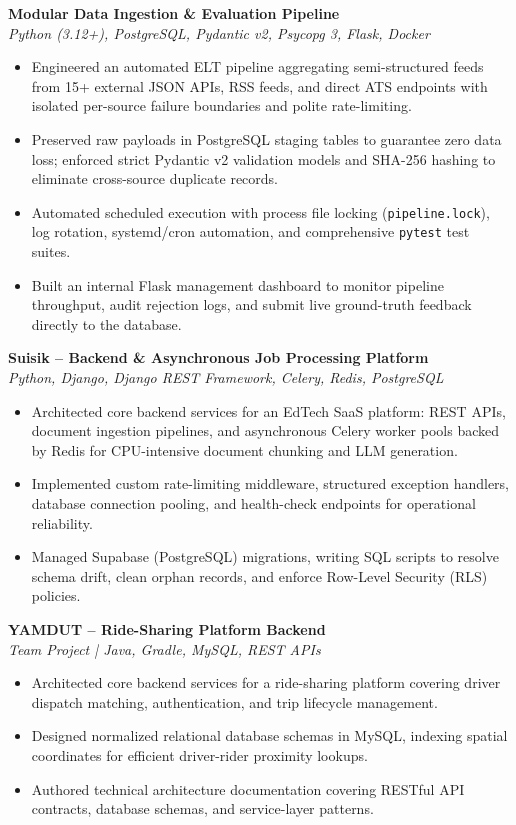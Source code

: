 \documentclass[a4paper,10pt]{article}
\begin{document}
\textbf{Modular Data Ingestion \& Evaluation Pipeline} \\
\textit{Python (3.12+), PostgreSQL, Pydantic v2, Psycopg 3, Flask, Docker}
\begin{itemize}
    \item Engineered an automated ELT pipeline aggregating semi-structured feeds from 15+ external JSON APIs, RSS feeds, and direct ATS endpoints with isolated per-source failure boundaries and polite rate-limiting.
    \item Preserved raw payloads in PostgreSQL staging tables to guarantee zero data loss; enforced strict Pydantic v2 validation models and SHA-256 hashing to eliminate cross-source duplicate records.
    \item Automated scheduled execution with process file locking (\texttt{pipeline.lock}), log rotation, systemd/cron automation, and comprehensive \texttt{pytest} test suites.
    \item Built an internal Flask management dashboard to monitor pipeline throughput, audit rejection logs, and submit live ground-truth feedback directly to the database.
\end{itemize}

\vspace{3pt}
\textbf{Suisik -- Backend \& Asynchronous Job Processing Platform} \\
\textit{Python, Django, Django REST Framework, Celery, Redis, PostgreSQL}
\begin{itemize}
    \item Architected core backend services for an EdTech SaaS platform: REST APIs, document ingestion pipelines, and asynchronous Celery worker pools backed by Redis for CPU-intensive document chunking and LLM generation.
    \item Implemented custom rate-limiting middleware, structured exception handlers, database connection pooling, and health-check endpoints for operational reliability.
    \item Managed Supabase (PostgreSQL) migrations, writing SQL scripts to resolve schema drift, clean orphan records, and enforce Row-Level Security (RLS) policies.
\end{itemize}

\vspace{3pt}
\textbf{YAMDUT -- Ride-Sharing Platform Backend} \\
\textit{Team Project | Java, Gradle, MySQL, REST APIs}
\begin{itemize}
    \item Architected core backend services for a ride-sharing platform covering driver dispatch matching, authentication, and trip lifecycle management.
    \item Designed normalized relational database schemas in MySQL, indexing spatial coordinates for efficient driver-rider proximity lookups.
    \item Authored technical architecture documentation covering RESTful API contracts, database schemas, and service-layer patterns.
\end{itemize}
\end{document}
